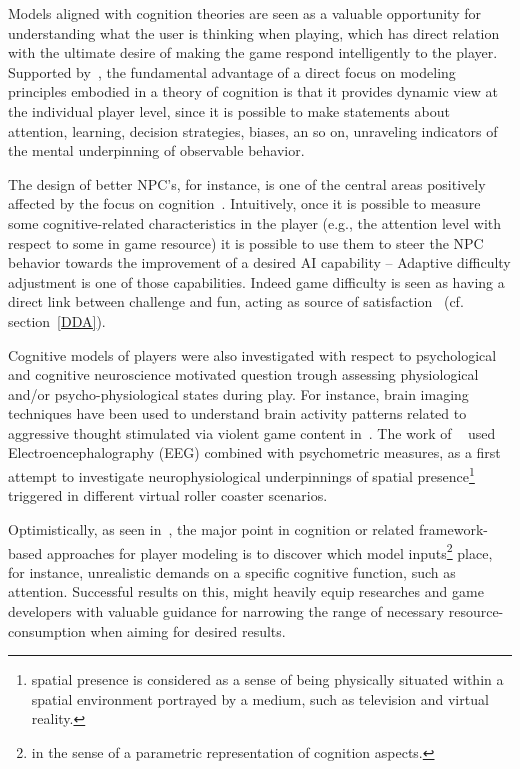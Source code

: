 Models aligned with cognition theories are seen as a valuable opportunity for understanding what the user is thinking when playing, which has direct relation with the ultimate desire of making the game respond intelligently to the player. Supported by~\cite{bohil_cognitive_2007}, the fundamental advantage of a direct focus on modeling principles embodied in a theory of cognition is that it provides dynamic view at the individual player level, since it is possible to make statements about attention, learning, decision strategies, biases, an so on, unraveling indicators of the mental underpinning of observable behavior. 

The design of better NPC's, for instance, is one of the central areas positively affected by the focus on cognition~\cite{funge_ai_1999}. Intuitively, once it is possible to measure some cognitive-related characteristics in the player (e.g., the attention level with respect to some in game resource) it is possible to use them to steer the NPC behavior towards the improvement of a desired AI capability -- Adaptive difficulty adjustment is one of those capabilities. Indeed game difficulty is seen as having a direct link between challenge and fun, acting as source of satisfaction~\cite{koster_theory_2013,yannakakis_modeling_2006} (cf. section~\ref{DDA}). 

Cognitive models of players were also investigated with respect to psychological and cognitive neuroscience motivated question trough assessing physiological and/or psycho-physiological states during play. For instance, brain imaging techniques have been used to understand brain activity patterns related to aggressive thought stimulated via violent game content in~\cite{weber_does_2006}. The work of ~\cite{baumgartner_neural_2006} used Electroencephalography (EEG) combined with psychometric measures, as a first attempt to investigate neurophysiological underpinnings of spatial presence\footnote{spatial presence is considered as a sense of being physically situated within a spatial environment portrayed by a medium, such as television and virtual reality.} triggered in different virtual roller coaster scenarios.

Optimistically, as seen in~\cite{bohil_cognitive_2007}, the major point in cognition or related framework-based approaches for player modeling is to discover which model inputs\footnote{in the sense of a parametric representation of cognition aspects.} place, for instance, unrealistic demands on a specific cognitive function, such as attention. Successful results on this, might heavily equip researches and game developers with valuable guidance for narrowing the range of necessary resource-consumption when aiming for desired results.   

